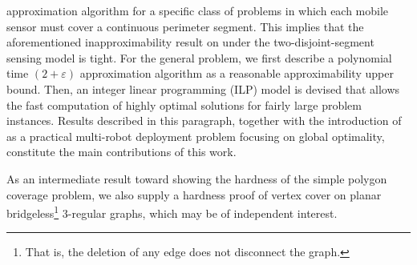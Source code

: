approximation algorithm
for a specific class of \opgt problems in which each mobile 
sensor must cover a continuous perimeter segment. This implies that the 
aforementioned inapproximability result on \opgt under the 
two-disjoint-segment sensing model is tight. 
%
For the general \osgt problem, we first describe a polynomial time 
$(2+\varepsilon)$ approximation algorithm as a reasonable approximability 
upper bound. 
%
Then, an integer linear programming (ILP) model is devised that allows 
the fast computation of highly optimal solutions for fairly large 
problem instances. 
%
Results described in this paragraph, together with the introduction 
of \osgt as a practical multi-robot deployment problem focusing on global 
optimality, constitute the main contributions of this work. 

As an intermediate result toward showing the hardness of the simple polygon
coverage problem, we also supply a hardness proof of vertex cover 
on planar bridgeless\footnote{That is, the deletion of any edge does not disconnect 
the graph.} $3$-regular graphs, which may be of independent interest. 


